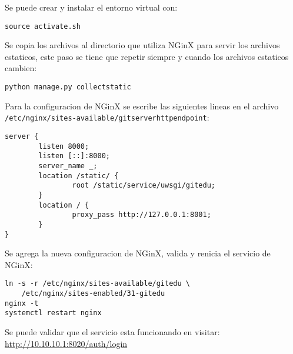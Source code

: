 Se puede crear y instalar el entorno virtual con:
\begin{lstlisting}
source activate.sh
\end{lstlisting}

Se copia los archivos al directorio que utiliza NGinX para servir los archivos estaticos, este paso se tiene que repetir siempre y cuando los archivos estaticos cambien:
\begin{lstlisting}
python manage.py collectstatic
\end{lstlisting}

Para la configuracion de NGinX se escribe las siguientes lineas en el archivo \\
\texttt{/etc/nginx/sites-available/gitserverhttpendpoint}:
\begin{lstlisting}
server {
        listen 8000;
        listen [::]:8000;
        server_name _;
        location /static/ {
                root /static/service/uwsgi/gitedu;
        }
        location / {
                proxy_pass http://127.0.0.1:8001;
        }
}
\end{lstlisting}

Se agrega la nueva configuracion de NGinX, valida y renicia el servicio de NGinX:
\begin{lstlisting}
ln -s -r /etc/nginx/sites-available/gitedu \ 
    /etc/nginx/sites-enabled/31-gitedu
nginx -t
systemctl restart nginx
\end{lstlisting}

Se puede validar que el servicio esta funcionando en visitar: \url{http://10.10.10.1:8020/auth/login}

